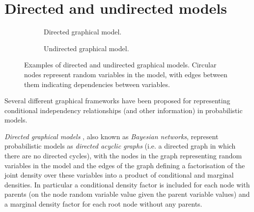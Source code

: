 
\section{Directed and undirected models}

\begin{figure}[!t]
\centering
\begin{subfigure}[b]{.5\linewidth}
\vskip 0pt
\centering
{}
\caption{Directed graphical model.}
\label{sfig:example-directed-graphical-model}
\end{subfigure}%
\begin{subfigure}[b]{.5\linewidth}
\vskip 0pt
\centering
{}
\caption{Undirected graphical model.}
\label{sfig:example-undirected-graphical-model}
\end{subfigure}%
\caption[Directed and undirected graphical models.]{Examples of directed and undirected graphical models. Circular nodes represent random variables in the model, with edges between them indicating dependencies between variables.}%
\label{fig:example-graphical-models}
\end{figure}

Several different graphical frameworks have been proposed for representing conditional independency relationships (and other information) in probabilistic models. 

\emph{Directed graphical models} \citep{pearl1988probabilistic}, also known as \emph{Bayesian networks}, represent probabilistic models as \emph{directed acyclic graphs} (i.e. a directed graph in which there are no directed cycles), with the nodes in the graph representing random variables in the model and the edges of the graph defining a factorisation of the joint density over these variables into a product of conditional and marginal densities. In particular a conditional density factor is included for each node with parents (on the node random variable value given the parent variable values) and a marginal density factor for each root node without any parents.

